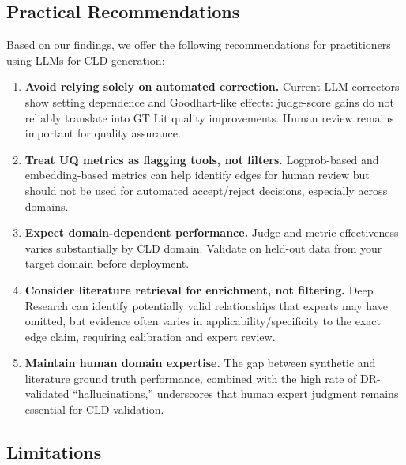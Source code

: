 \subsection{Practical Recommendations}
\label{sec:discussion_recommendations}

Based on our findings, we offer the following recommendations for practitioners using LLMs for CLD generation:

\begin{enumerate}
    \item \textbf{Avoid relying solely on automated correction.} Current LLM correctors show setting dependence and Goodhart-like effects: judge-score gains do not reliably translate into GT Lit quality improvements. Human review remains important for quality assurance.
    
    \item \textbf{Treat UQ metrics as flagging tools, not filters.} Logprob-based and embedding-based metrics can help identify edges for human review but should not be used for automated accept/reject decisions, especially across domains.
    
    \item \textbf{Expect domain-dependent performance.} Judge and metric effectiveness varies substantially by CLD domain. Validate on held-out data from your target domain before deployment.
    
    \item \textbf{Consider literature retrieval for enrichment, not filtering.} Deep Research can identify potentially valid relationships that experts may have omitted, but evidence often varies in applicability/specificity to the exact edge claim, requiring calibration and expert review.
    
    \item \textbf{Maintain human domain expertise.} The gap between synthetic and literature ground truth performance, combined with the high rate of DR-validated ``hallucinations,'' underscores that human expert judgment remains essential for CLD validation.
\end{enumerate}

\subsection{Limitations}
\label{sec:discussion_limitations}

